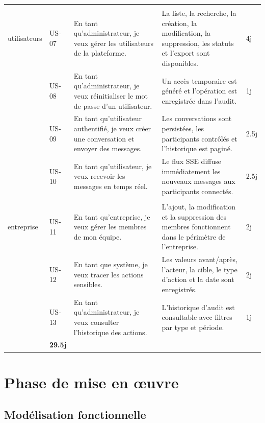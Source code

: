 \documentclass[12pt,a4paper]{report}
\begin{document}
\begin{longtable}{|>{\centering\arraybackslash}p{2.7cm}|>{\centering\arraybackslash}p{1.3cm}|>{\raggedright\arraybackslash}p{4.8cm}|>{\raggedright\arraybackslash}p{4.8cm}|>{\centering\arraybackslash}p{1.2cm}|}
\multirow{2}{2.7cm}{\centering\textbf{Gestion\\utilisateurs}}
& US-07 & En tant qu'administrateur, je veux gérer les utilisateurs de la plateforme. & La liste, la recherche, la création, la modification, la suppression, les statuts et l'export sont disponibles. & 4j \\
\cline{2-5}
& US-08 & En tant qu'administrateur, je veux réinitialiser le mot de passe d'un utilisateur. & Un accès temporaire est généré et l'opération est enregistrée dans l'audit. & 1j \\
\hline

\multirow{2}{2.7cm}{\centering\textbf{Messagerie}}
& US-09 & En tant qu'utilisateur authentifié, je veux créer une conversation et envoyer des messages. & Les conversations sont persistées, les participants contrôlés et l'historique est paginé. & 2.5j \\
\cline{2-5}
& US-10 & En tant qu'utilisateur, je veux recevoir les messages en temps réel. & Le flux SSE diffuse immédiatement les nouveaux messages aux participants connectés. & 2.5j \\
\hline

\multirow{1}{2.7cm}{\centering\textbf{Equipe\\entreprise}}
& US-11 & En tant qu'entreprise, je veux gérer les membres de mon équipe. & L'ajout, la modification et la suppression des membres fonctionnent dans le périmètre de l'entreprise. & 2j \\
\hline

\multirow{2}{2.7cm}{\centering\textbf{Audit}}
& US-12 & En tant que système, je veux tracer les actions sensibles. & Les valeurs avant/après, l'acteur, la cible, le type d'action et la date sont enregistrés. & 2j \\
\cline{2-5}
& US-13 & En tant qu'administrateur, je veux consulter l'historique des actions. & L'historique d'audit est consultable avec filtres par type et période. & 1j \\
\hline
\rowcolor{mainblue!10}
\multicolumn{4}{|r|}{\textbf{Total estimé}} & \textbf{29.5j} \\
\hline
\end{longtable}

\section{Phase de mise en \oe uvre}

\subsection{Modélisation fonctionnelle}
\end{document}
